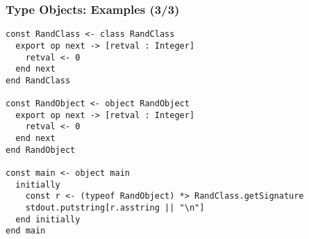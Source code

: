 \begin{frame}[fragile]

\frametitle{Type Objects: Examples (3/3)}

\begin{lstlisting}
const RandClass <- class RandClass
  export op next -> [retval : Integer]
    retval <- 0
  end next
end RandClass

const RandObject <- object RandObject
  export op next -> [retval : Integer]
    retval <- 0
  end next
end RandObject

const main <- object main
  initially
    const r <- (typeof RandObject) *> RandClass.getSignature
    stdout.putstring[r.asstring || "\n"]
  end initially
end main
\end{lstlisting}

\end{frame}

